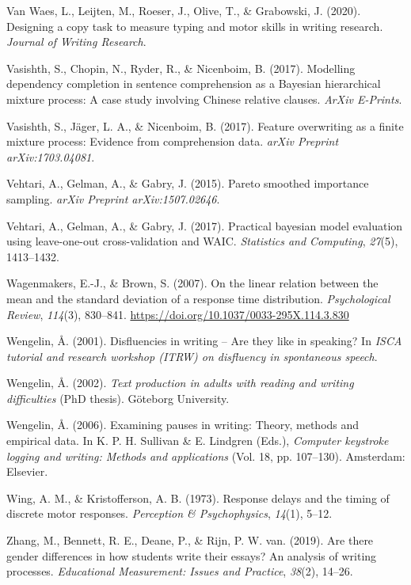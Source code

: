 \documentclass[english,man,floatsintext]{apa7}
\begin{document}
\leavevmode\hypertarget{ref-waes2019}{}%
Van Waes, L., Leijten, M., Roeser, J., Olive, T., \& Grabowski, J. (2020). Designing a copy task to measure typing and motor skills in writing research. \emph{Journal of Writing Research}.

\leavevmode\hypertarget{ref-vasishth2017}{}%
Vasishth, S., Chopin, N., Ryder, R., \& Nicenboim, B. (2017). Modelling dependency completion in sentence comprehension as a Bayesian hierarchical mixture process: A case study involving Chinese relative clauses. \emph{ArXiv E-Prints}.

\leavevmode\hypertarget{ref-vasishth2017feature}{}%
Vasishth, S., Jäger, L. A., \& Nicenboim, B. (2017). Feature overwriting as a finite mixture process: Evidence from comprehension data. \emph{arXiv Preprint arXiv:1703.04081}.

\leavevmode\hypertarget{ref-vehtari2015pareto}{}%
Vehtari, A., Gelman, A., \& Gabry, J. (2015). Pareto smoothed importance sampling. \emph{arXiv Preprint arXiv:1507.02646}.

\leavevmode\hypertarget{ref-vehtari2017practical}{}%
Vehtari, A., Gelman, A., \& Gabry, J. (2017). Practical bayesian model evaluation using leave-one-out cross-validation and WAIC. \emph{Statistics and Computing}, \emph{27}(5), 1413--1432.

\leavevmode\hypertarget{ref-wagenmakers2007linear}{}%
Wagenmakers, E.-J., \& Brown, S. (2007). On the linear relation between the mean and the standard deviation of a response time distribution. \emph{Psychological Review}, \emph{114}(3), 830--841. \url{https://doi.org/10.1037/0033-295X.114.3.830}

\leavevmode\hypertarget{ref-wengelin2001disfluencies}{}%
Wengelin, Å. (2001). Disfluencies in writing -- Are they like in speaking? In \emph{ISCA tutorial and research workshop (ITRW) on disfluency in spontaneous speech}.

\leavevmode\hypertarget{ref-wen02}{}%
Wengelin, Å. (2002). \emph{Text production in adults with reading and writing difficulties} (PhD thesis). Göteborg University.

\leavevmode\hypertarget{ref-wen06}{}%
Wengelin, Å. (2006). Examining pauses in writing: Theory, methods and empirical data. In K. P. H. Sullivan \& E. Lindgren (Eds.), \emph{Computer keystroke logging and writing: Methods and applications} (Vol. 18, pp. 107--130). Amsterdam: Elsevier.

\leavevmode\hypertarget{ref-wing1973response}{}%
Wing, A. M., \& Kristofferson, A. B. (1973). Response delays and the timing of discrete motor responses. \emph{Perception \& Psychophysics}, \emph{14}(1), 5--12.

\leavevmode\hypertarget{ref-zhang2019there}{}%
Zhang, M., Bennett, R. E., Deane, P., \& Rijn, P. W. van. (2019). Are there gender differences in how students write their essays? An analysis of writing processes. \emph{Educational Measurement: Issues and Practice}, \emph{38}(2), 14--26.
\end{document}
